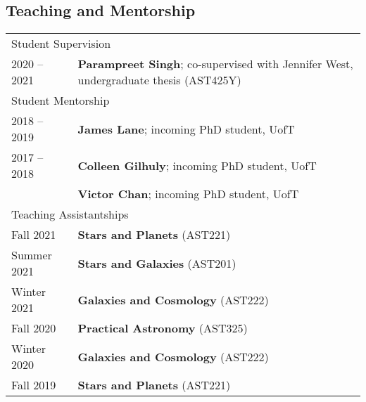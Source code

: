 \documentclass[10pt]{res} %
\begin{document}
\begin{resume}

\section{\Large Teaching and Mentorship}
\vspace{-5pt} %
\noindent\makebox[\linewidth]{\rule{\textwidth}{0.4pt}}
\vspace{-20pt} %
\begin{table}[h!]
\begin{tabularx}{\textwidth}{ @{} p{6.5em} X @{} }
%
%
\multicolumn{2}{l}{ \rule{0pt}{3ex} \large \hspace{-12pt} Student Supervision \dotfill \rule[-1.2ex]{0pt}{0pt}} \\
2020 -- 2021 & \textbf{Parampreet Singh}; co-supervised with Jennifer West, undergraduate thesis (AST425Y) \\
%
%
\multicolumn{2}{l}{ \rule{0pt}{3ex} \large \hspace{-12pt} Student Mentorship \dotfill \rule[-1.2ex]{0pt}{0pt}} \\
2018 -- 2019 & \textbf{James Lane}; incoming PhD student, UofT \\
2017 -- 2018 & \textbf{Colleen Gilhuly}; incoming PhD student, UofT \\
                     & \textbf{Victor Chan}; incoming PhD student, UofT \\
%
%
\multicolumn{2}{l}{ \rule{0pt}{3ex} \large \hspace{-12pt} Teaching Assistantships \dotfill \rule[-1.2ex]{0pt}{0pt}} \\
Fall 2021        & \textbf{Stars and Planets} (AST221) \\
Summer 2021 & \textbf{Stars and Galaxies} (AST201) \\
Winter 2021    & \textbf{Galaxies and Cosmology} (AST222) \\
Fall 2020         & \textbf{Practical Astronomy} (AST325) \\
Winter 2020    & \textbf{Galaxies and Cosmology} (AST222) \\
Fall 2019         & \textbf{Stars and Planets} (AST221) \\

\end{tabularx}
\end{table}
\end{resume}
\end{document}
